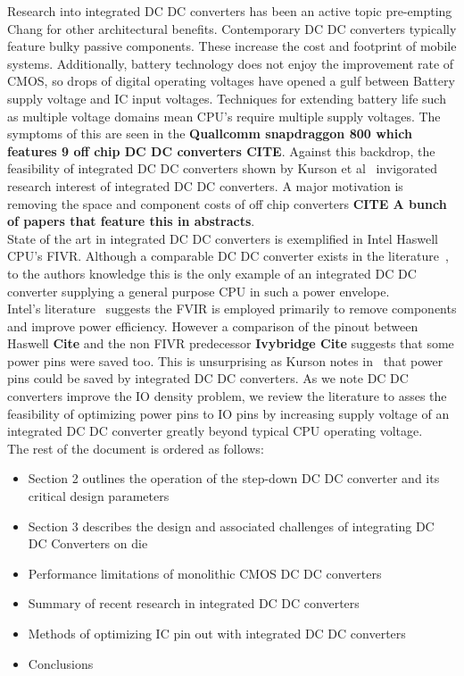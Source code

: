 \documentclass[letterpaper,twocolumn,10pt]{article}
\begin{document}
\indent Research into integrated DC DC converters has been an active topic pre-empting Chang for other architectural benefits. Contemporary DC DC converters typically feature bulky passive components. These increase the cost and footprint of mobile systems. Additionally, battery technology does not enjoy the improvement rate of CMOS, so drops of digital operating voltages have opened a gulf between Battery supply voltage and IC input voltages. Techniques for extending battery life such as multiple voltage domains mean CPU's require multiple supply voltages. The symptoms of this are seen in the \textbf{Quallcomm snapdraggon 800 which features 9 off chip DC DC converters CITE}. Against this backdrop, the feasibility of integrated DC DC converters shown by Kurson et al~\cite{Kurson2003} invigorated research interest of integrated DC DC converters. A major motivation is removing the space and component costs of off chip converters \textbf{CITE A bunch of papers that feature this in abstracts}.\\
\indent State of the art in integrated DC DC converters is exemplified in Intel Haswell CPU's FIVR. Although a comparable DC DC converter exists in the literature~\cite{Sturcken2012}, to the authors knowledge this is the only example of an integrated DC DC converter supplying a general purpose CPU in such a power envelope.\\
Intel's literature~\cite{Intel2010} %
suggests the FVIR is employed primarily to remove components and improve power efficiency. However a comparison of the pinout between Haswell \textbf{Cite} and the non FIVR predecessor \textbf{Ivybridge Cite} suggests that some power pins were saved too. This is unsurprising as Kurson notes in~\cite{Kurson2003} that power pins could be saved by integrated DC DC converters. As we note DC DC converters improve the IO density problem, we review the literature to asses the feasibility of optimizing power pins to IO pins by increasing supply voltage of an integrated DC DC converter greatly beyond typical CPU operating voltage.\\
\indent The rest of the document is ordered as follows:\\
\begin{itemize}
\item{Section 2 outlines the operation of the step-down DC DC converter and its critical design parameters}
\item{Section 3 describes the design and associated challenges of integrating DC DC Converters on die}
\item{Performance limitations of monolithic CMOS DC DC converters}
\item{Summary of recent research in integrated DC DC converters}
\item{Methods of optimizing IC pin out with integrated DC DC converters}
\item{Conclusions}
\end{itemize}
 
\end{document}
